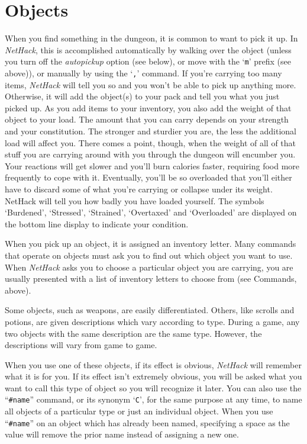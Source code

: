 \section{Objects}

When you find something in the dungeon, it is common to want to pick
it up.  In {\it NetHack}, this is accomplished automatically by walking over
the object (unless you turn off the {\it autopickup\/}
option (see below), or move with the `{\tt m}' prefix (see above)), or
manually by using the `{\tt ,}' command.
If you're carrying too many items, {\it NetHack\/} will tell you so and you
won't be able to pick up anything more.  Otherwise, it will add the object(s)
to your pack and tell you what you just picked up.
As you add items to your inventory, you also add the weight of that object
to your load.  The amount that you can carry depends on your strength and
your constitution.  The
stronger and sturdier
you are, the less the additional load will affect you.  There comes
a point, though, when the weight of all of that stuff you are carrying around
with you through the dungeon will encumber you.  Your reactions
will get slower and you'll burn calories faster, requiring food more frequently
to cope with it.  Eventually, you'll be so overloaded that you'll either have
to discard some of what you're carrying or collapse under its weight.
NetHack will tell you how badly you have loaded yourself.  The symbols
`Burdened', `Stressed', `Strained', `Overtaxed' and `Overloaded' are
displayed on the bottom line display to indicate your condition.

When you pick up an object, it is assigned an inventory letter.  Many
commands that operate on objects must ask you to find out which object
you want to use.  When {\it NetHack\/} asks you to choose a particular object
you are carrying, you are usually presented with a list of inventory
letters to choose from (see Commands, above).

Some objects, such as weapons, are easily differentiated.  Others, like
scrolls and potions, are given descriptions which vary according to
type.  During a game, any two objects with the same description are
the same type.  However, the descriptions will vary from game to game.

When you use one of these objects, if its effect is obvious, {\it NetHack\/}
will remember what it is for you.  If its effect isn't extremely
obvious, you will be asked what you want to call this type of object
so you will recognize it later.  You can also use the ``{\tt \#name}''
command, or its synonym `{\tt C}', for the same purpose at any time, to name
all objects of a particular type or just an individual object.
When you use ``{\tt \#name}'' on an object which has already been named,
specifying a space as the value will remove the prior name instead
of assigning a new one.

